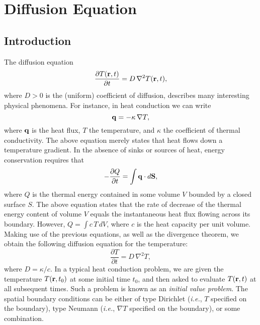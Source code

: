 \chapter{Diffusion Equation}
\section{Introduction}
The diffusion equation
\begin{equation}
\frac{\partial T({\bf r},t)}{\partial t} = D\,\nabla^2 T({\bf r},t),
\end{equation}
where $D>0$ is the (uniform) coefficient of diffusion, describes many interesting physical
phenomena. For instance, in heat conduction we can write
\begin{equation}
{\bf q} = - \kappa\,\nabla T,
\end{equation}
where ${\bf q}$ is the heat flux, $T$ the temperature, and $\kappa$ the coefficient
of thermal conductivity. The above equation merely states that heat flows down a temperature
gradient. In the absence of sinks or sources of heat, energy conservation
requires that
\begin{equation}
-\frac{\partial Q}{\partial t} =  \int {\bf q}\cdot d{\bf S},
\end{equation}
where $Q$ is the thermal energy contained in  some volume $V$ bounded by a closed surface $S$.
The above equation states that the rate of decrease of the thermal energy content of
 volume $V$
 equals  the instantaneous heat flux flowing across its boundary.
However, $Q=\int c\,T\,dV$, where $c$ is the heat capacity per unit volume. Making
use of the previous
equations, as well as the divergence theorem, we obtain the following diffusion
equation for the temperature:
\begin{equation}
\frac{\partial T}{\partial t} = D\,\nabla^2 T,
\end{equation}
where $D=\kappa/c$. In a typical heat conduction problem, we are given the
temperature  $T({\bf r}, t_0)$ at some initial time $t_0$, and then asked
to evaluate $T({\bf r},t)$ at all subsequent times. Such a problem is
known as an {\em initial value problem}. The spatial boundary conditions can be either
of type Dirichlet ({\em i.e.}, $T$ specified on the boundary), type
Neumann ({\em i.e.}, $\nabla T$ specified on the boundary), or some combination.

